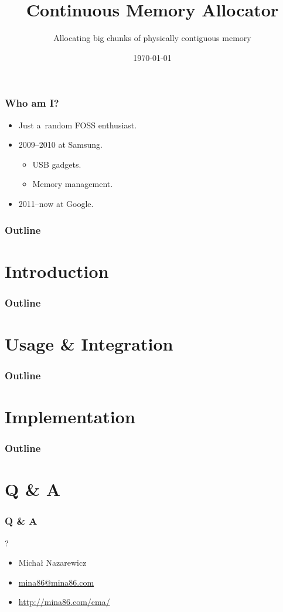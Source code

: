 \documentclass{beamer}
\title{Continuous Memory Allocator}
\subtitle{Allocating big chunks of physically contiguous memory}
\author[\theauthor]{%
  \texorpdfstring{\theauthor\vskip 8pt%
    \scriptsize\href{mailto:\theemail}{\theemail}}{%
    \theauthor}}
\institute{\Google}
\date{\today}
\makeatletter
\newcommand\Section[1]{%
\section{#1}%
\begin{frame}%
\frametitle{Outline}
\tableofcontents[currentsection]%
\end{frame}}
\newcommand\theauthor{Michał Nazarewicz}
\newcommand\theemail{mina86@mina86.com}
\makeatother
\begin{document}
\begin{frame}
  \titlepage
\end{frame}

\begin{frame}
  \frametitle{Who am I?}

  \begin{itemize}
  \item Just a~random FOSS enthusiast.
  \item 2009--2010 at Samsung.
    \begin{itemize}
    \item USB gadgets.
    \item Memory management.
    \end{itemize}
  \item 2011--now at Google.
  \end{itemize}
\end{frame}

\begin{frame}
  \frametitle{Outline}
  \tableofcontents
\end{frame}

\Section{Introduction}


\Section{Usage \& Integration}



\Section{Implementation}


\appendix

\section*{Q \& A}
\begin{frame}
  \frametitle{Q \& A}

  \begin{center}
  {\Huge ?}
  \end{center}

  \vskip 30pt

  \begin{itemize}
  \item \theauthor
  \item \href{mailto:\theemail}{\theemail}
  \item \url{http://mina86.com/cma/}
  \end{itemize}
\end{frame}
\end{document}
